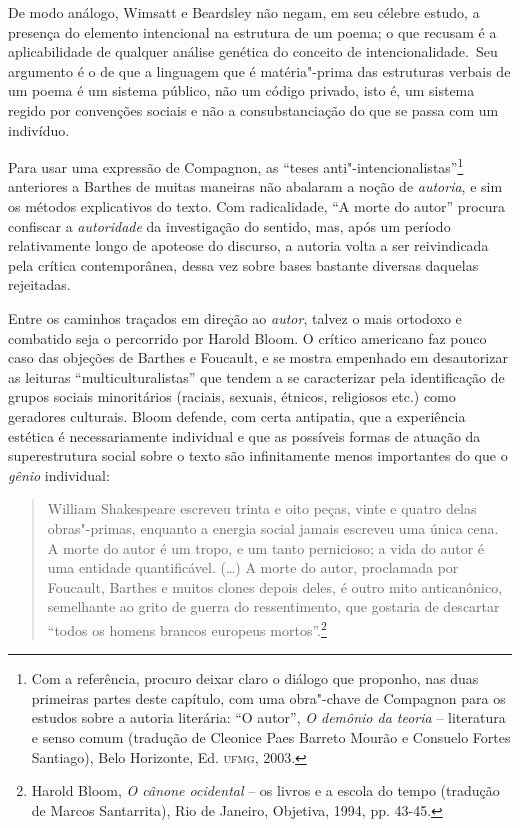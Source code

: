 De modo análogo, Wimsatt e Beardsley não negam, em seu célebre estudo, a presença do elemento intencional na estrutura de um poema; o que recusam
é a aplicabilidade de qualquer análise genética do conceito de
intencionalidade.~Seu argumento é o de que a linguagem que é
matéria"-prima das estruturas verbais de um poema é um sistema público,
não um código privado, isto é, um sistema regido por convenções sociais
e não a consubstanciação do que se passa com um indivíduo.

Para usar uma expressão de Compagnon, as ``teses
anti"-intencionalistas''\footnote{Com a referência, procuro deixar claro
  o diálogo que proponho, nas duas primeiras partes deste capítulo, com
  uma obra"-chave de Compagnon para os estudos sobre a autoria literária:
  ``O autor'', \emph{O demônio da teoria} -- literatura e senso comum
  (tradução de Cleonice Paes Barreto Mourão e Consuelo Fortes Santiago),
  Belo Horizonte, Ed. \textsc{ufmg}, 2003.} anteriores a Barthes de
muitas maneiras não abalaram a noção de \emph{autoria}, e sim os métodos
explicativos do texto. Com radicalidade, ``A morte do autor'' procura
confiscar a \emph{autoridade} da investigação do sentido, mas, após um
período relativamente longo de apoteose do discurso, a autoria volta a
ser reivindicada pela crítica contemporânea, dessa vez sobre bases
bastante diversas daquelas rejeitadas.

Entre os caminhos traçados em direção ao \emph{autor}, talvez o mais
ortodoxo e combatido seja o percorrido por Harold Bloom. O crítico
americano faz pouco caso das objeções de Barthes e Foucault, e se mostra
empenhado em desautorizar as leituras ``multiculturalistas'' que tendem
a se caracterizar pela identificação de grupos sociais minoritários
(raciais, sexuais, étnicos, religiosos etc.) como geradores culturais.
Bloom defende, com certa antipatia, que a experiência estética é
necessariamente individual e que as possíveis formas de atuação da
superestrutura social sobre o texto são infinitamente menos importantes
do que o \emph{gênio }individual:

\begin{quote}
William Shakespeare escreveu trinta e oito peças, vinte e quatro delas
obras"-primas, enquanto a energia social jamais escreveu uma única cena.
A morte do autor é um tropo, e um tanto pernicioso; a vida do autor é
uma entidade quantificável. (\ldots{}) A morte do autor, proclamada por
Foucault, Barthes e muitos clones depois deles, é outro mito
anticanônico, semelhante ao grito de guerra do ressentimento, que
gostaria de descartar ``todos os homens brancos europeus
mortos''.\footnote{Harold Bloom, \emph{O cânone ocidental} -- os livros
  e a escola do tempo (tradução de Marcos Santarrita), Rio de Janeiro,
  Objetiva, 1994, pp. 43-45.}
\end{quote}

